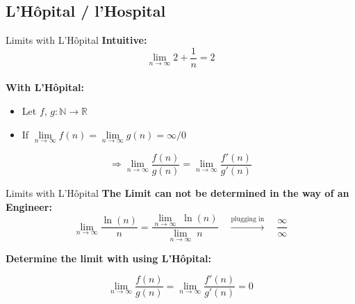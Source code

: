 \subsection{L'H\^{o}pital / l'Hospital}

\begin{frame}{Limits with L'H\^{o}pital}
  \textbf{Intuitive:}\\
  \begin{displaymath}
    \lim\limits_{n \rightarrow \infty} 2 + \dfrac{1}{n} = 2
  \end{displaymath}
  \vspace{0.0em}\\
  \textbf{With L'H\^{o}pital:}
  \begin{itemize}
    \item
      Let $f, \, g : \mathbb{N} \rightarrow \mathbb{R}$
    \item
      If
      \begin{math}
        \lim\limits_{n \to \infty} f(n)
          = \lim\limits_{n \to \infty} g(n)
          = \infty / 0
      \end{math}
  \end{itemize}
  \begin{displaymath}
    \Rightarrow \lim\limits_{n \rightarrow \infty} \dfrac{f(n)}{g(n)}
      = \lim\limits_{n \rightarrow \infty} \dfrac{f'(n)}{g'(n)}
  \end{displaymath}
\end{frame}


\begin{frame}{Limits with L'H\^{o}pital}
  \textbf{The Limit can not be determined in the way of an Engineer:}
  \begin{displaymath}
    \lim_{n \to \infty} \dfrac{\ln (n)}{n}
      = \dfrac{\lim_{n \to \infty}\; \ln (n)}{\lim\limits_{n \to \infty}\; n}
    \hspace{1em} \stackrel{\text{plugging in}}{\longrightarrow} \hspace{1em}
      \dfrac{\infty}{\infty}
  \end{displaymath}
  
  \textbf{Determine the limit with using L'H\^{o}pital:}
  
  \begin{displaymath}
      \lim\limits_{n \rightarrow \infty} \dfrac{f(n)}{g(n)}
        = \lim\limits_{n \rightarrow \infty} \dfrac{f'(n)}{g'(n)} = 0
    \end{displaymath}
  
\end{frame}

